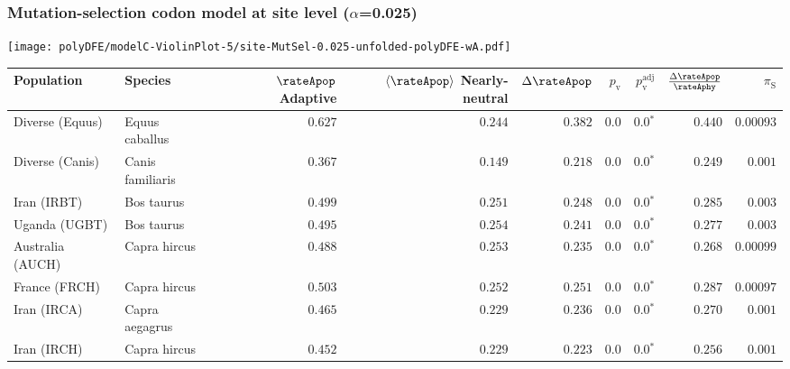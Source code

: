 \subsubsection*{Mutation-selection codon model at site level ($\alpha$=0.025)}
\begin{center}
    \texttt{[image: polyDFE/modelC-ViolinPlot-5/site-MutSel-0.025-unfolded-polyDFE-wA.pdf]}
    \begin{adjustbox}{width = 1\textwidth}
        \begin{tabular}{|l|l|r|r|r|r|r|r|r|}
            \toprule
            Population & Species & \specialcell{$\rateApop$ \\ Adaptive}                & \specialcell{$\left< \rateApop \right>$ \\ Nearly-neutral}                & $\Delta \rateApop $    & $p_{\mathrm{v}}$ & $p_{\mathrm{v}}^{\mathrm{adj}}$ & $\frac{\Delta\rateApop}{\rateAphy}$ & $\pi_{\textrm{S}}$    \\
            \midrule
            Diverse (Equus)                    & Equus caballus          & $ 0.627$ & $ 0.244$ & $ 0.382$ & $0.0$    & $\bm{0.0{^*}}$    & $ 0.440$ & $0.00093$  \\
            Diverse (Canis)                  & Canis familiaris          & $ 0.367$ & $ 0.149$ & $ 0.218$ & $0.0$    & $\bm{0.0{^*}}$    & $ 0.249$ & $ 0.001$ \\
            Iran (IRBT)               & Bos taurus        & $ 0.499$ & $ 0.251$ & $ 0.248$ & $0.0$    & $\bm{0.0{^*}}$    & $ 0.285$ & $ 0.003$ \\
            Uganda (UGBT)                  & Bos taurus        & $ 0.495$ & $ 0.254$ & $ 0.241$ & $0.0$    & $\bm{0.0{^*}}$    & $ 0.277$ & $ 0.003$ \\
            Australia (AUCH)                    & Capra hircus      & $ 0.488$ & $ 0.253$ & $ 0.235$ & $0.0$    & $\bm{0.0{^*}}$    & $ 0.268$ & $0.00099$ \\
            France (FRCH)                    & Capra hircus        & $ 0.503$ & $ 0.252$ & $ 0.251$ & $0.0$    & $\bm{0.0{^*}}$    & $ 0.287$ & $0.00097$ \\
            Iran (IRCA)                   & Capra aegagrus        & $ 0.465$ & $ 0.229$ & $ 0.236$ & $0.0$    & $\bm{0.0{^*}}$    & $ 0.270$ & $ 0.001$ \\
            Iran (IRCH)                 & Capra hircus        & $ 0.452$ & $ 0.229$ & $ 0.223$ & $0.0$    & $\bm{0.0{^*}}$    & $ 0.256$ & $ 0.001$ \\

\end{tabular}
\end{adjustbox}
\end{center}
